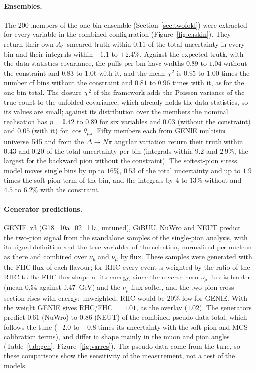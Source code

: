 \documentclass[11pt,a4paper]{article}
\begin{document}
\paragraph{Ensembles.} The 200 members of the one-bin ensemble (Section~\ref{sec:twofold}) were extracted for every
variable in the combined configuration (Figure~\ref{fig:enskin}). They return their own $A_C$-smeared truth within
$0.11$ of the total uncertainty in every bin and their integrals within $-1.1$ to $+2.4\%$. Against the expected truth,
with the data-statistics covariance, the pulls per bin have widths $0.89$ to $1.04$ without the constraint and $0.83$ to
$1.06$ with it, and the mean $\chi^2$ is $0.95$ to $1.00$ times the number of bins without the constraint and $0.81$ to
$0.96$ times with it, as for the one-bin total. The closure $\chi^2$ of the framework adds the Poisson variance of the
true count to the unfolded covariance, which already holds the data statistics, so its values are small; against its
distribution over the members the nominal realisation has $p=0.42$ to $0.89$ for six variables and $0.03$ (without the
constraint) and $0.05$ (with it) for $\cos\theta_{\mu\pi}$. Fifty members each from GENIE multisim universe~545 and
from the $\Delta\to N\pi$ angular variation return their truth within $0.43$ and $0.20$ of the total uncertainty per
bin (integrals within $9.2$ and $2.9\%$, the largest for the backward pion without the constraint). The softest-pion
stress model moves single bins by up to $16\%$, $0.53$ of the total uncertainty and up to $1.9$ times the soft-pion
term of the bin, and the integrals by $4$ to $13\%$ without and $4.5$ to $6.2\%$ with the constraint.

\paragraph{Generator predictions.} GENIE~v3 (G18\_10a\_02\_11a, untuned), GiBUU, NuWro and NEUT predict the
two-pion signal from the standalone samples of the single-pion analysis, with its signal definition and the true
variables of the selection, normalised per nucleon as there and combined over $\nu_\mu$ and $\bar\nu_\mu$ by flux.
These samples were generated with the FHC flux of each flavour; for RHC every event is weighted by the ratio of the
RHC to the FHC flux shape at its energy, since the reverse-horn $\nu_\mu$ flux is harder (mean $0.54$ against
$0.47$~GeV) and the $\bar\nu_\mu$ flux softer, and the two-pion cross section rises with energy: unweighted, RHC
would be $20\%$ low for GENIE. With the weight GENIE gives RHC/FHC $=1.01$, as the overlay ($1.02$). The generators
predict $0.61$ (NuWro) to $0.86$ (NEUT) of the combined pseudo-data total, which follows the tune ($-2.0$ to $-0.8$
times its uncertainty with the soft-pion and MCS-calibration terms), and differ in shape mainly in the muon and pion
angles (Table~\ref{tab:gen}, Figure~\ref{fig:varres}). The pseudo-data come from the tune, so these comparisons show
the sensitivity of the measurement, not a test of the models.
\end{document}
